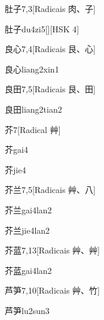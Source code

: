 \begin{entry}{肚子}{7,3}[Radicais ⾁、⼦]
  \begin{phonetics}{肚子}{du4zi5}[][HSK 4]
  \end{phonetics}
\end{entry}

\begin{entry}{良心}{7,4}[Radicais ⾉、⼼]
  \begin{phonetics}{良心}{liang2xin1}
  \end{phonetics}
\end{entry}

\begin{entry}{良田}{7,5}[Radicais ⾉、⽥]
  \begin{phonetics}{良田}{liang2tian2}
  \end{phonetics}
\end{entry}

\begin{entry}{芥}{7}[Radical ⾋]
  \begin{phonetics}{芥}{gai4}
  \end{phonetics}
  \begin{phonetics}{芥}{jie4}
  \end{phonetics}
\end{entry}

\begin{entry}{芥兰}{7,5}[Radicais ⾋、⼋]
  \begin{phonetics}{芥兰}{gai4lan2}
  \end{phonetics}
  \begin{phonetics}{芥兰}{jie4lan2}
  \end{phonetics}
\end{entry}

\begin{entry}{芥蓝}{7,13}[Radicais ⾋、⾋]
  \begin{phonetics}{芥蓝}{gai4lan2}
  \end{phonetics}
\end{entry}

\begin{entry}{芦笋}{7,10}[Radicais ⾋、⽵]
  \begin{phonetics}{芦笋}{lu2sun3}
  \end{phonetics}
\end{entry}

